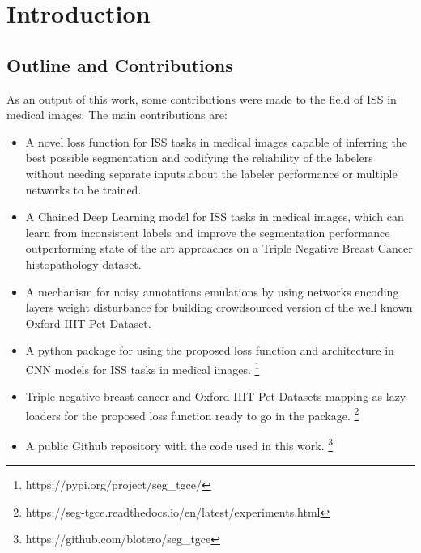 \chapter{Introduction}\label{ch:introduction}







\clearpage
\section{Outline and Contributions}

As an output of this work, some contributions were made to the field of
\gls{ISS} in medical images. The main contributions are:

\begin{itemize}
  \item A novel loss function for \gls{ISS} tasks in medical images capable of
    inferring the best possible segmentation and codifying the
    reliability of the labelers without needing separate inputs about
    the labeler performance or multiple networks to be trained.
  \item A Chained Deep Learning model for \gls{ISS} tasks in medical
    images, which can learn from inconsistent labels and improve the
    segmentation performance outperforming state of the art
    approaches on a Triple Negative Breast Cancer histopathology dataset.
  \item A mechanism for noisy annotations emulations by using networks
    encoding layers weight disturbance for building crowdsourced
    version of the well known Oxford-IIIT Pet Dataset.
  \item A python package for using the proposed loss function and
    architecture in \gls{CNN} models for \gls{ISS} tasks in medical images.
    \footnote{https://pypi.org/project/seg\_tgce/}
  \item Triple negative breast cancer and Oxford-IIIT Pet Datasets
    mapping as lazy loaders for the proposed loss function ready to go in
    the package.
    \footnote{https://seg-tgce.readthedocs.io/en/latest/experiments.html}
  \item A public Github repository with the code used in this work.
    \footnote{https://github.com/blotero/seg\_tgce}
\end{itemize}
